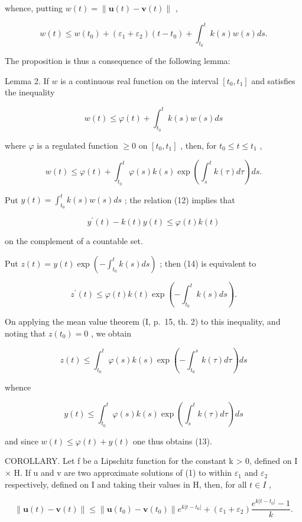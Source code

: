 whence, putting \(w(t) = \|\mathbf{u}(t) - \mathbf{v}(t)\|\) ,

\[
w (t) \leqslant w \left(t _ {0}\right) + \left(\varepsilon_ {1} + \varepsilon_ {2}\right) \left(t - t _ {0}\right) + \int_ {t _ {0}} ^ {t} k (s) w (s) d s.\tag{11}
\]

The proposition is thus a consequence of the following lemma:

Lemma 2. If \(w\) is a continuous real function on the interval \([t_0, t_1]\) and satisfies the inequality

\[
w (t) \leqslant \varphi (t) + \int_ {t _ {0}} ^ {t} k (s) w (s) d s\tag{12}
\]

where \(\varphi\) is a regulated function \(\geqslant 0\) on \([t_0, t_1]\) , then, for \(t_0 \leqslant t \leqslant t_1\) ,

\[
w (t) \leqslant \varphi (t) + \int_ {t _ {0}} ^ {t} \varphi (s) k (s) \exp \left(\int_ {s} ^ {t} k (\tau) d \tau\right) d s.\tag{13}
\]

Put \(y(t) = \int_{t_0}^{t} k(s)w(s)ds\) ; the relation (12) implies that

\[
y ^ {\prime} (t) - k (t) y (t) \leqslant \varphi (t) k (t)\tag{14}
\]

on the complement of a countable set.

Put \(z(t) = y(t)\exp \left(-\int_{t_0}^t k(s)ds\right)\) ; then (14) is equivalent to

\[
z ^ {\prime} (t) \leqslant \varphi (t) k (t) \exp \left(- \int_ {t _ {0}} ^ {t} k (s) d s\right).
\]

On applying the mean value theorem (I, p.~15, th. 2) to this inequality, and noting that \(z(t_0) = 0\) , we obtain

\[
z (t) \leqslant \int_ {t _ {0}} ^ {t} \varphi (s) k (s) \exp \left(- \int_ {t _ {0}} ^ {s} k (\tau) d \tau\right) d s
\]

whence

\[
y (t) \leqslant \int_ {t _ {0}} ^ {t} \varphi (s) k (s) \exp \left(\int_ {s} ^ {t} k (\tau) d \tau\right) d s
\]

and since \(w(t) \leqslant \varphi(t) + y(t)\) one thus obtains (13).

COROLLARY. Let f be a Lipschitz function for the constant k \textgreater{} 0, defined on I × H. If u and v are two approximate solutions of (1) to within \(\varepsilon_{1}\) and \(\varepsilon_{2}\) respectively, defined on I and taking their values in H, then, for all \(t \in I\) ,

\[
\| \mathbf {u} (t) - \mathbf {v} (t) \| \leqslant \| \mathbf {u} (t _ {0}) - \mathbf {v} (t _ {0}) \| e ^ {k | t - t _ {0} |} + (\varepsilon_ {1} + \varepsilon_ {2}) \frac {e ^ {k | t - t _ {0} |} - 1}{k}.\tag{15}
\]

